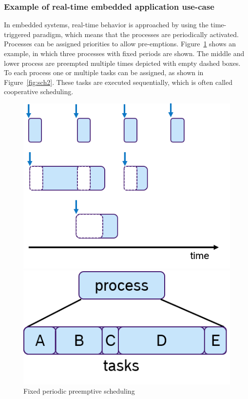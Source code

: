 \subsubsection{Example of real-time embedded application use-case}
In embedded systems, real-time behavior is approached by using the time-triggered paradigm, which means that the processes are periodically activated. Processes can be assigned priorities to allow pre-emptions. Figure~\ref{fig:sch1} shows an example, in which three processes with fixed periods are shown. The middle and lower process are preempted multiple times depicted with empty dashed boxes. To each process one or multiple tasks can be assigned, as shown in Figure~\ref{fig:sch2}. These tasks are executed sequentially, which is often called cooperative scheduling.
\begin{figure}[t!]
    \begin{minipage}[t]{0.5\textwidth}
        \setcaptionwidth{2in}
        \includegraphics[scale = 0.8]{Img/scheduling_01.png}
        \caption{Fixed periodic preemptive scheduling}
        \label{fig:sch1} %
    \end{minipage}
    \begin{minipage}[t]{0.5\textwidth}
        \setcaptionwidth{2in}
        \includegraphics[scale = 0.8]{Img/scheduling_02.png}

\end{minipage}
\end{figure}
